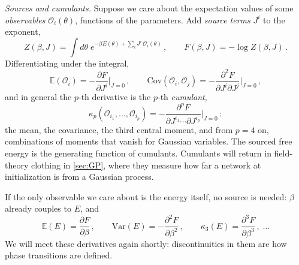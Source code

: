 \documentclass[11pt]{article}
\newcommand{\E}{\mathbb{E}}
\newcommand{\CO}{{\mathcal O}}
\newcommand{\pd}{\partial}
\begin{document}
\emph{Sources and cumulants.} Suppose we care about the expectation values of some \emph{observables} $\CO_i(\theta)$, functions of the parameters. Add \emph{source terms} $J^i$ to the exponent,
%
\begin{equation}
    Z(\beta,J) = \int d\theta\; e^{-\beta E(\theta) + \sum_i J^i\,\CO_i(\theta)}\,,\qquad F(\beta,J) = -\log Z(\beta,J)\,.
\end{equation}
%
Differentiating under the integral,
%
\begin{equation} \label{R-cumulants}
    \E(\CO_i) = -\frac{\pd F}{\pd J^i}\bigg|_{J=0}\,,\qquad
    \mathrm{Cov}(\CO_i,\CO_j) = -\frac{\pd^2 F}{\pd J^i\pd J^j}\bigg|_{J=0}\,,
\end{equation}
%
and in general the $p$-th derivative is the $p$-th \emph{cumulant},
%
\begin{equation}
    \kappa_p(\CO_{i_1},\ldots,\CO_{i_p}) = -\frac{\pd^p F}{\pd J^{i_1}\cdots\pd J^{i_p}}\bigg|_{J=0}\,:
\end{equation}
%
the mean, the covariance, the third central moment, and from $p=4$ on, combinations of moments that vanish for Gaussian variables. The sourced free energy is the generating function of cumulants. Cumulants will return in field-theory clothing in \cref{sec:GP}, where they measure how far a network at initialization is from a Gaussian process.

If the only observable we care about is the energy itself, no source is needed: $\beta$ already couples to $E$, and
%
\begin{equation}
    \E(E) = \frac{\pd F}{\pd \beta}\,,\qquad \mathrm{Var}(E) = -\frac{\pd^2 F}{\pd\beta^2}\,,\qquad \kappa_3(E) = \frac{\pd^3 F}{\pd \beta^3}\,,\;\ldots \label{E-cumulants}
\end{equation}
%
We will meet these derivatives again shortly: discontinuities in them are how phase transitions are defined.
\end{document}
